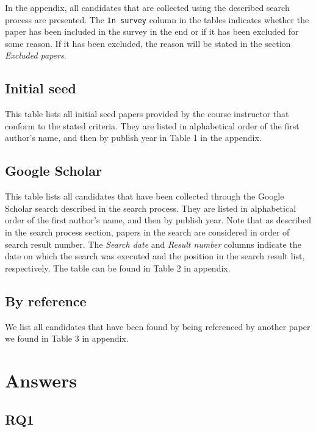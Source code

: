 \documentclass[]{book}
\begin{document}
In the appendix, all candidates that are collected using the described
search process are presented. The \texttt{In\ survey} column in the
tables indicates whether the paper has been included in the survey in
the end or if it has been excluded for some reason. If it has been
excluded, the reason will be stated in the section \emph{Excluded
papers}.

\subsection{Initial seed}\label{initial-seed-1}

This table lists all initial seed papers provided by the course
instructor that conform to the stated criteria. They are listed in
alphabetical order of the first author's name, and then by publish year
in Table 1 in the appendix.

\subsection{Google Scholar}\label{google-scholar}

This table lists all candidates that have been collected through the
Google Scholar search described in the search process. They are listed
in alphabetical order of the first author's name, and then by publish
year. Note that as described in the search process section, papers in
the search are considered in order of search result number. The
\emph{Search date} and \emph{Result number} columns indicate the date on
which the search was executed and the position in the search result
list, respectively. The table can be found in Table 2 in appendix.

\subsection{By reference}\label{by-reference}

We list all candidates that have been found by being referenced by
another paper we found in Table 3 in appendix.

\section{Answers}\label{answers-4}

\subsection{RQ1}\label{rq1}
\end{document}
